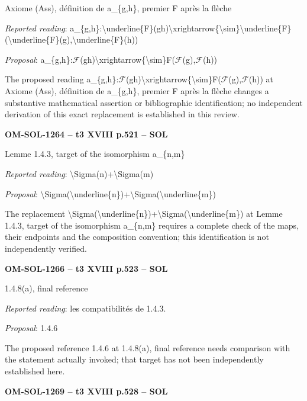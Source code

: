 Axiome (Ass), définition de a\_\{g,h\}, premier F après la flèche\par
\emph{Reported reading}: a\_\{g,h\}:\textbackslash{}underline\{F\}(gh)\textbackslash{}xrightarrow\{\textbackslash{}sim\}\textbackslash{}underline\{F\}(\textbackslash{}underline\{F\}(g),\textbackslash{}underline\{F\}(h))\par
\emph{Proposal}: a\_\{g,h\}:\ensuremath{\mathcal{F}}(gh)\textbackslash{}xrightarrow\{\textbackslash{}sim\}F(\ensuremath{\mathcal{F}}(g),\ensuremath{\mathcal{F}}(h))\par
The proposed reading a\_\{g,h\}:\ensuremath{\mathcal{F}}(gh)\textbackslash{}xrightarrow\{\textbackslash{}sim\}F(\ensuremath{\mathcal{F}}(g),\ensuremath{\mathcal{F}}(h)) at Axiome (Ass), définition de a\_\{g,h\}, premier F après la flèche changes a substantive mathematical assertion or bibliographic identification; no independent derivation of this exact replacement is established in this review.\par
\par\noindent\textbf{OM-SOL-1264 -- t3 XVIII p.521 -- SOL}\par
Lemme 1.4.3, target of the isomorphism a\_\{n,m\}\par
\emph{Reported reading}: \textbackslash{}Sigma(n)+\textbackslash{}Sigma(m)\par
\emph{Proposal}: \textbackslash{}Sigma(\textbackslash{}underline\{n\})+\textbackslash{}Sigma(\textbackslash{}underline\{m\})\par
The replacement \textbackslash{}Sigma(\textbackslash{}underline\{n\})+\textbackslash{}Sigma(\textbackslash{}underline\{m\}) at Lemme 1.4.3, target of the isomorphism a\_\{n,m\} requires a complete check of the maps, their endpoints and the composition convention; this identification is not independently verified.\par
\par\noindent\textbf{OM-SOL-1266 -- t3 XVIII p.523 -- SOL}\par
1.4.8(a), final reference\par
\emph{Reported reading}: les compatibilités de 1.4.3.\par
\emph{Proposal}: 1.4.6\par
The proposed reference 1.4.6 at 1.4.8(a), final reference needs comparison with the statement actually invoked; that target has not been independently established here.\par
\par\noindent\textbf{OM-SOL-1269 -- t3 XVIII p.528 -- SOL}\par
